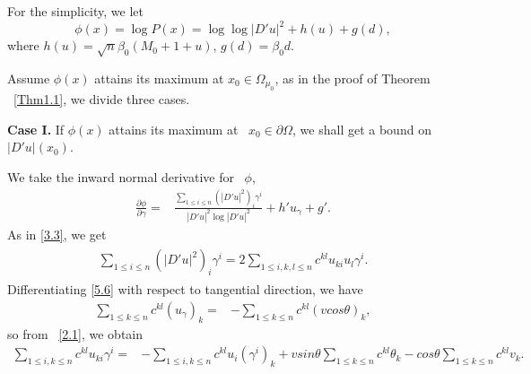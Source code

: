 \documentclass[11pt]{amsart}
\numberwithin{equation}{section}
\begin{document}
For the simplicity, we let
$$\phi(x)=\log P(x)=\log\log|D'u|^2+h(u)+g(d),$$  where $h(u)=\sqrt{n}\beta_0(M_0+1+u)$, $g(d)=\beta_0 d.$


Assume $\phi(x)$ attains its maximum at $x_0\in \Omega_{\mu_0}$, as in the proof of Theorem ~\ref{Thm1.1}, we divide three cases.


{\bf Case I.}  If $\phi(x)$ attains its maximum at ~$x_0\in \partial \Omega$,  we shall get a bound on $|D'u|(x_0)$.

We take the inward normal derivative for ~$\phi$,
\begin{align}\label{5.7}
\frac{\partial\phi}{\partial\gamma}=&\frac{\sum_{1\leq i\leq n}(|D'u|^2)_i\gamma^i}{|D'u|^2\log|D'u|^2}+h'u_{\gamma}+g'.
\end{align}
As in  \eqref{3.3},  we get
\begin{align}\label{5.8}
\begin{split}
\sum_{1\leq i\leq n}(|D'u|^2)_i\gamma^i=2\sum_{1\leq i,k,l\leq n}c^{kl}u_{ki}u_l\gamma^i.
\end{split}
\end{align}
Differentiating \eqref{5.6} with respect to tangential direction, we have
\begin{align}\label{5.9}
\sum_{1\leq k\leq n}c^{kl}(u_{\gamma})_k=&-\sum_{1\leq k\leq n}c^{kl}(v cos\theta)_k,
\end{align}
so from ~\eqref{2.1}, we obtain
\begin{align}\label{5.10}
\sum_{1\leq i,k\leq n}c^{kl}u_{ki}\gamma^i
=&-\sum_{1\leq i,k\leq n}c^{kl}u_i(\gamma^i)_k
+vsin\theta \sum_{1\leq k\leq n}c^{kl}\theta_k -cos\theta \sum_{1\leq k\leq n}c^{kl}v_k.
\end{align}
\end{document}
